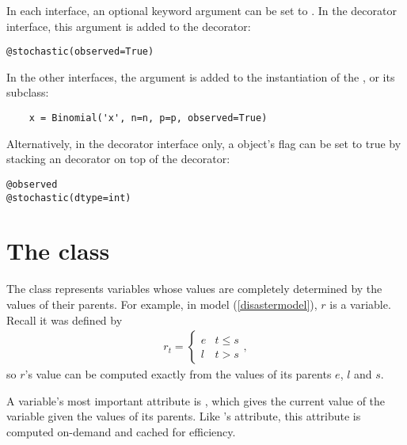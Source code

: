 In each interface, an optional keyword argument  can be set to . In the decorator interface, this argument is added to the  decorator:

\begin{verbatim}
@stochastic(observed=True)
\end{verbatim}

In the other interfaces, the  argument is added to the instantiation of the , or its subclass:

\begin{verbatim}
	x = Binomial('x', n=n, p=p, observed=True)
\end{verbatim}

Alternatively, in the decorator interface only, a  object's  flag can be set to true by stacking an  decorator on top of the  decorator:
\begin{verbatim}
@observed
@stochastic(dtype=int)
\end{verbatim}

\hypertarget{deterministic}{}
\section[The Deterministic class]{The  class}
\label{deterministic}

The  class represents variables whose values are completely determined by the values of their parents. For example, in model (\ref{disastermodel}), $r$ is a  variable. Recall it was defined by
\begin{eqnarray*}
    r_t=\left\{\begin{array}{ll}
        e & t\le s\\ l & t>s
        \end{array}\right.,
\end{eqnarray*}
so $r$'s value can be computed exactly from the values of its parents $e$, $l$ and $s$.

A  variable's most important attribute is , which gives the current value of the variable given the values of its parents. Like 's  attribute, this attribute is computed on-demand and cached for efficiency.

